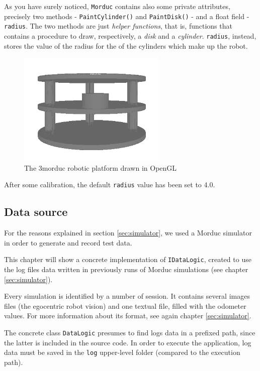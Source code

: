 %
As you have surely noticed, \texttt{Morduc} contains also 
some private attributes, precisely two methods - 
\texttt{PaintCylinder()} and \texttt{PaintDisk()} - and 
a float field - \texttt{radius}.
%
The two methods are just \textit{helper functions}, that is, 
functions that contains a procedure to draw, respectively,  
a \textit{disk} and a \textit{cylinder}.
%
\texttt{radius}, instead, stores the value of the radius 
for the of the cylinders which make up the robot.
%
\begin{figure}[!h]
  \begin{center}
    \includegraphics[width=200pt]{img/3morduc_opengl.png}
    \caption{The 3morduc robotic platform drawn in OpenGL}
    \label{fig:3morduc_opengl}
  \end{center}
\end{figure}
%
After some calibration, the default \texttt{radius} value 
has been set to 4.0.
%

%
\subsection{Data source}
\label{sub:datasource}
For the reasons explained in section \ref{sec:simulator}, 
we used a Morduc simulator in order to generate and record 
test data.



This chapter will show a concrete implementation of 
\texttt{IDataLogic}, created to use the log files data written
in previously runs of Morduc simulations (see chapter \ref{sec:simulator}).


%

%
Every simulation is identified by a number of session. It contains several
images files (the egocentric robot vision) and one textual file, filled with the
odometer values. For more information about its format, see again chapter
\ref{sec:simulator}.
%

%
The concrete class \texttt{DataLogic} presumes to find logs data in a prefixed
path, since the latter is included in the source code. In order to execute the
application, log data must be saved in the \texttt{log} upper-level folder (compared
to the execution path).
%

